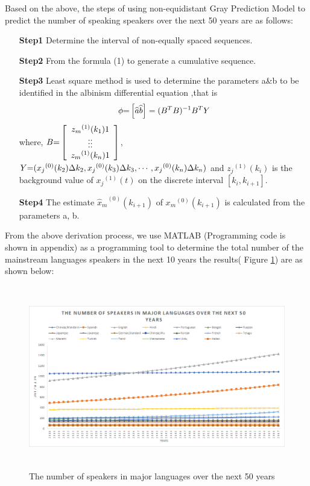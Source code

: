 Based on the above, the steps of using non-equidistant Gray Prediction Model to predict the number of speaking speakers over the next 50 years are as follows:

 \begin{enumerate}
 \item[\textbf{Step1}]  Determine the interval of non-equally spaced sequences.
 \item[\textbf{Step2}] From the formula (1) to generate a cumulative sequence.
 \item[\textbf{Step3}] Least square method is used to determine the parameters a\&b to be identified in the albinism differential equation ,that is
		 \begin{equation}
		 \phi {\rm{ = }}\left[ {\widehat a\widehat b} \right] = {({B^T}B)^{ - 1}}{B^T}Y 
		 \end{equation}
	where, $B{\rm{ = }}\left[ {\begin{array}{*{20}{c}}
		{{z_m}^{(1)}({k_1})}1\\
		\vdots  \vdots \\
		{{z_m}^{(1)}({k_n})}1
		\end{array}} \right]$, $Y{\rm{ = }}({x_j}^{(0)}({k_2})\Delta {k_2},{x_j}^{(0)}({k_3})\Delta {k_3}, \cdots ,{x_j}^{(0)}({k_n})\Delta {k_n})$ and ${z_j}^{(1)}({k_i})$  is the background value  of ${x_j}^{(1)}(t)$  on the discrete interval  $\left[ {{k_i},{k_{i + 1}}} \right]$.
  \item[\textbf{Step4}] The estimate ${\widehat x_m}^{(0)}({k_{i + 1}})$ of ${x_m}^{(0)}({k_{i + 1}})$  is calculated from the parameters a, b.
\end{enumerate}

From the above derivation process, we use MATLAB (Programming code is shown in appendix) as a programming tool to determine the total number of the mainstream languages speakers in the next 10 years the results( Figure \ref{fig:next50}) are as shown below:
     

\begin{figure}[H]
	\centering
	\includegraphics[width=1\linewidth,height=8cm]{figures/next50number}
	\caption{The number of speakers in major languages over the next 50 years}
	\label{fig:next50}
\end{figure}

